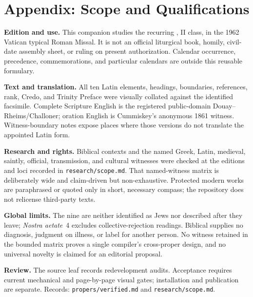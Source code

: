 \section*{Appendix: Scope and Qualifications}
\begin{studyframe}
\textbf{Edition and use.} This companion studies the recurring
, II class, in the 1962 Vatican
typical Roman Missal. It is not an official liturgical book, homily, civil-date
assembly sheet, or ruling on present authorization. Calendar occurrence,
precedence, commemorations, and particular calendars are outside this reusable
formulary.

\textbf{Text and translation.} All ten Latin elements, headings, boundaries,
references, rank, Credo, and Trinity Preface were visually collated against
the identified facsimile. Complete Scripture English is the registered
public-domain Douay--Rheims/Challoner; oration English is Cummiskey's anonymous
1861 witness. Witness-boundary notes expose places where those versions do not
translate the appointed Latin form.

\textbf{Research and rights.} Biblical contexts and the named Greek, Latin,
medieval, saintly, official, transmission, and cultural witnesses were checked
at the editions and loci recorded in \texttt{research/scope.md}. That
named-witness matrix is deliberately wide and claim-driven but non-exhaustive.
Protected modern works are paraphrased
or quoted only in short, necessary compass; the repository does not relicense
third-party texts.

\textbf{Global limits.} The nine are neither identified as Jews nor described
after they leave; \emph{Nostra aetate}~4 excludes collective-rejection
readings. Biblical  supplies no diagnosis, judgment on illness,
or label for another person. No witness retained in the bounded matrix proves
a single compiler's cross-proper design, and no universal novelty is claimed
for an editorial proposal.

\textbf{Review.} The source leaf records redevelopment audits. Acceptance
requires current mechanical and page-by-page visual gates; installation and
publication are separate. Records:
\nolinkurl{propers/verified.md} and \nolinkurl{research/scope.md}.
\end{studyframe}
